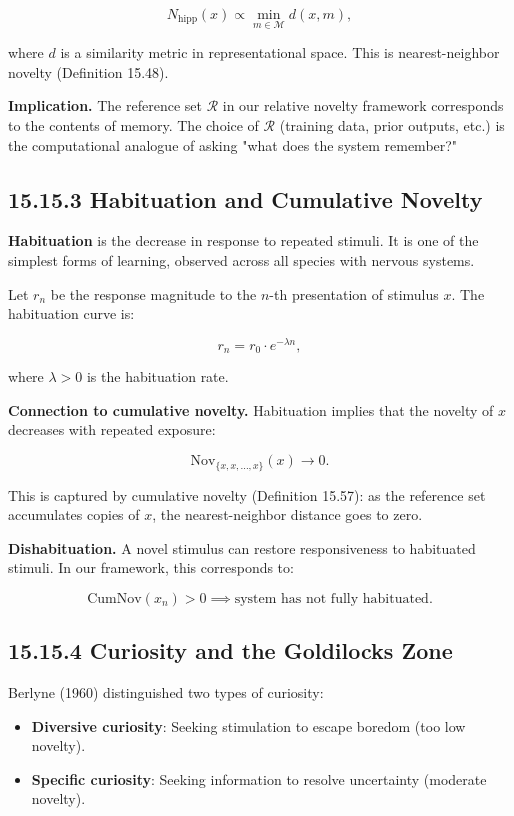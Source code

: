 \[N_{\mathrm{hipp}}(x) \propto \min_{m \in \mathcal{M}} d(x, m),\]

where $d$ is a similarity metric in representational space. This is nearest-neighbor novelty (Definition 15.48).

\textbf{Implication.} The reference set $\mathcal{R}$ in our relative novelty framework corresponds to the contents of memory. The choice of $\mathcal{R}$ (training data, prior outputs, etc.) is the computational analogue of asking "what does the system remember?"

\subsection{15.15.3 Habituation and Cumulative Novelty}

\textbf{Habituation} is the decrease in response to repeated stimuli. It is one of the simplest forms of learning, observed across all species with nervous systems.

\begin{definition}
Let $r_n$ be the response magnitude to the $n$-th presentation of stimulus $x$. The habituation curve is:

\[r_n = r_0 \cdot e^{-\lambda n},\]

where $\lambda > 0$ is the habituation rate.

\textbf{Connection to cumulative novelty.} Habituation implies that the novelty of $x$ decreases with repeated exposure:

\[\mathrm{Nov}_{\{x, x, \ldots, x\}}(x) \to 0.\]

This is captured by cumulative novelty (Definition 15.57): as the reference set accumulates copies of $x$, the nearest-neighbor distance goes to zero.

\textbf{Dishabituation.} A novel stimulus can restore responsiveness to habituated stimuli. In our framework, this corresponds to:

\[\mathrm{CumNov}(x_n) > 0 \implies \text{system has not fully habituated}.\]
\end{definition}

\subsection{15.15.4 Curiosity and the Goldilocks Zone}

Berlyne (1960) distinguished two types of curiosity:
\begin{itemize}
\item \textbf{Diversive curiosity}: Seeking stimulation to escape boredom (too low novelty).
\item \textbf{Specific curiosity}: Seeking information to resolve uncertainty (moderate novelty).
\end{itemize}

